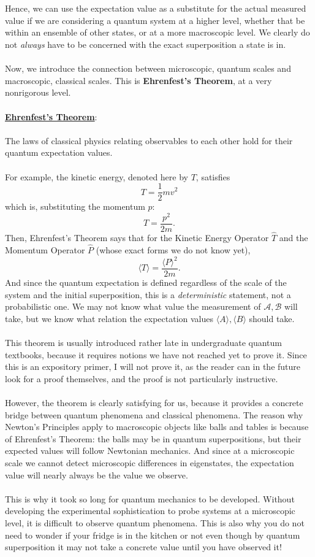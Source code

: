 \\\\
Hence, we can use the expectation value as a substitute for the actual measured value if we are considering a quantum system at a higher level, whether that be within an ensemble of other states, or at a more macroscopic level. We clearly do not \textit{always} have to be concerned with the exact superposition a state is in.
\\\\
Now, we introduce the connection between microscopic, quantum scales and macroscopic, classical scales. This is \textbf{Ehrenfest's Theorem}, at a very nonrigorous level.
\\\\
\underline{\textbf{Ehrenfest's Theorem}}:
\\\\
The laws of classical physics relating observables to each other hold for their quantum expectation values. 
\\\\
For example, the kinetic energy, denoted here by $T$, satisfies
$$
T = \frac{1}{2}mv^{2}
$$
which is, substituting the momentum $p$:
$$
T = \frac{p^2}{2m}.
$$
Then, Ehrenfest's Theorem says that for the Kinetic Energy Operator $\hat{T}$ and the Momentum Operator $\hat{P}$ (whose exact forms we do not know yet),
$$
\langle T \rangle = \frac{\langle P \rangle^{2}}{2m}.
$$
And since the quantum expectation is defined regardless of the scale of the system and the initial superposition, this is a \textit{deterministic} statement, not a probabilistic one. We may not know what value the measurement of $\mathcal{A}, \mathcal{B}$ will take, but we know what relation the expectation values $\langle A \rangle, \langle B \rangle$ should take.
\\\\
This theorem is usually introduced rather late in undergraduate quantum textbooks, because it requires notions we have not reached yet to prove it. Since this is an expository primer, I will not prove it, as the reader can in the future look for a proof themselves, and the proof is not particularly instructive.
\\\\
However, the theorem is clearly satisfying for us, because it provides a concrete bridge between quantum phenomena and classical phenomena. The reason why Newton's Principles apply to macroscopic objects like balls and tables is because of Ehrenfest's Theorem: the balls may be in quantum superpositions, but their expected values will follow Newtonian mechanics. And since at a microscopic scale we cannot detect microscopic differences in eigenstates, the expectation value will nearly always be the value we observe. 
\\\\
This is why it took so long for quantum mechanics to be developed. Without developing the experimental sophistication to probe systems at a microscopic level, it is difficult to observe quantum phenomena. This is also why you do not need to wonder if your fridge is in the kitchen or not even though by quantum superposition it may not take a concrete value until you have observed it!
